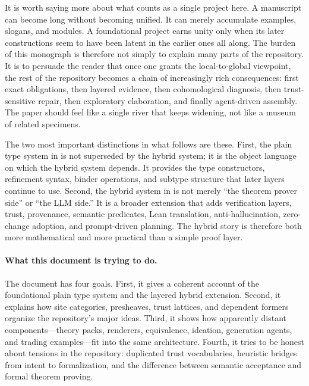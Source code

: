 It is worth saying more about what counts as a single project here. A manuscript can become
long without becoming unified. It can merely accumulate examples, slogans, and modules. A
foundational project earns unity only when its later constructions seem to have been latent
in the earlier ones all along. The burden of this monograph is therefore not simply to
explain many parts of the repository. It is to persuade the reader that once one grants the
local-to-global viewpoint, the rest of the repository becomes a chain of increasingly rich
consequences: first exact obligations, then layered evidence, then cohomological diagnosis,
then trust-sensitive repair, then exploratory elaboration, and finally agent-driven
assembly. The paper should feel like a single river that keeps widening, not like a museum
of related specimens.

The two most important distinctions in what follows are these. First, the plain type
system in  is not superseded by the hybrid system; it is the
object language on which the hybrid system depends. It provides the type constructors,
refinement syntax, binder operations, and subtype structure that later layers continue to
use. Second, the hybrid system in  is not merely ``the theorem
prover side'' or ``the LLM side.'' It is a broader extension that adds verification
layers, trust, provenance, semantic predicates, Lean translation, anti-hallucination,
zero-change adoption, and prompt-driven planning. The hybrid story is therefore both more
mathematical and more practical than a simple proof layer.

\paragraph{What this document is trying to do.}
The document has four goals. First, it gives a coherent account of the foundational plain
type system and the layered hybrid extension. Second, it explains how site categories,
presheaves, trust lattices, and dependent formers organize the repository's major ideas.
Third, it shows how apparently distant components---theory packs, renderers, equivalence,
ideation, generation agents, and trading examples---fit into the same architecture.
Fourth, it tries to be honest about tensions in the repository: duplicated trust vocabularies,
heuristic bridges from intent to formalization, and the difference between semantic
acceptance and formal theorem proving.

